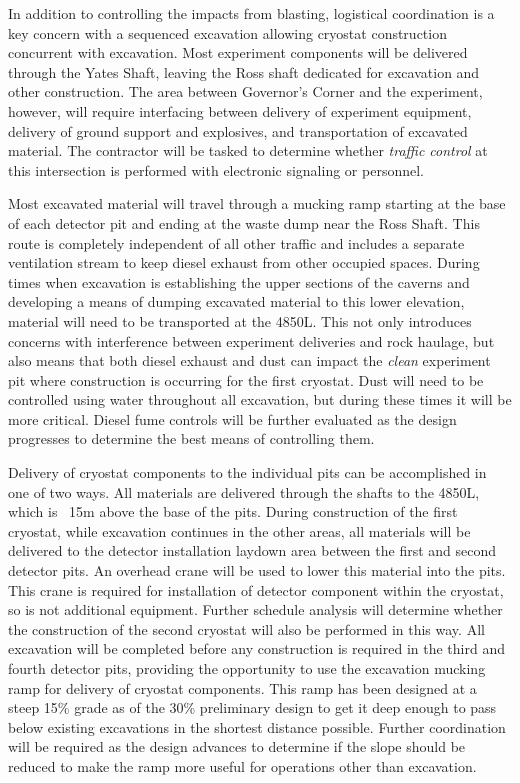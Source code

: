 In addition to controlling the impacts from blasting, logistical coordination is a key concern with a sequenced excavation allowing cryostat construction concurrent with excavation.  Most experiment components will be delivered through the Yates Shaft, leaving the Ross shaft dedicated for excavation and other construction.  The area between Governor's Corner and the experiment, however, will require interfacing between delivery of experiment equipment, delivery of ground support and explosives, and transportation of excavated material.  The contractor will be tasked to determine whether \textit{traffic control} at this intersection is performed with electronic signaling or personnel.

Most excavated material will travel through a mucking ramp starting at the base of each detector pit and ending at the waste dump near the Ross Shaft.  This route is completely independent of all other traffic and includes a separate ventilation stream to keep diesel exhaust from other occupied spaces.  During times when excavation is establishing the upper sections of the caverns and developing a means of dumping excavated material to this lower elevation, material will need to be transported at the 4850L.  This not only introduces concerns with interference between experiment deliveries and rock haulage, but also means that both diesel exhaust and dust can impact the \textit{clean} experiment pit where construction is occurring for the first cryostat.  Dust will need to be controlled using water throughout all excavation, but during these times it will be more critical.  Diesel fume controls will be further evaluated as the design progresses to determine the best means of controlling them.

Delivery of cryostat components to the individual pits can be accomplished in one of two ways.  All materials are delivered through the shafts to the 4850L, which is ~15m above the base of the pits.  During construction of the first cryostat, while excavation continues in the other areas, all materials will be delivered to the detector installation laydown area between the first and second detector pits.  An overhead crane will be used to lower this material into the pits.  This crane is required for installation of detector component within the cryostat, so is not additional equipment.  Further schedule analysis will determine whether the construction of the second cryostat will also be performed in this way.  All excavation will be completed before any construction is required in the third and fourth detector pits, providing the opportunity to use the excavation mucking ramp for delivery of cryostat components.  This ramp has been designed at a steep 15\% grade as of the 30\% preliminary design to get it deep enough to pass below existing excavations in the shortest distance possible.  Further coordination will be required as the design advances to determine if the slope should be reduced to make the ramp more useful for operations other than excavation.

